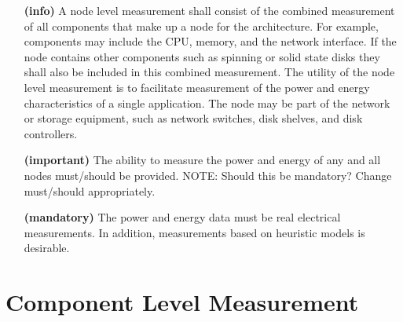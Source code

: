 \begin{itemize}

\item[\textbf{(info)}]
A node level measurement shall consist of the combined measurement of all components that 
make up a node for the architecture. For example, components may include the CPU, memory, 
and the network interface. If the node contains other components such as spinning or solid 
state disks they shall also be included in this combined measurement. The utility of the 
node level measurement is to facilitate measurement of the power and energy characteristics 
of a single application. The node may be part of the network or storage equipment, such 
as network switches, disk shelves, and disk controllers.   

\item[\textbf{(important)}]
The ability to measure the power and energy of any and all nodes must/should 
be provided.  NOTE: Should this be mandatory? Change must/should appropriately.

\item[\textbf{(mandatory)}]
The power and energy data must be real electrical measurements. In addition, 
measurements based on heuristic models is desirable. 
\end{itemize}


\section{Component Level Measurement}

